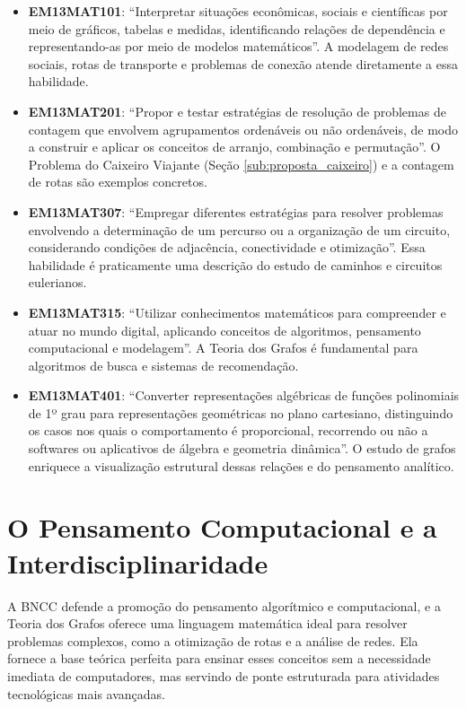 \documentclass[
  12pt,
  oneside,
  a4paper,
  english,
  brazilian
  ]{abntex2}
\theoremstyle{definition}
\begin{document}
\begin{itemize}
  \item \textbf{EM13MAT101}: ``Interpretar situações econômicas, sociais e científicas por meio de gráficos, tabelas e medidas, identificando relações de dependência e representando-as por meio de modelos matemáticos''. A modelagem de redes sociais, rotas de transporte e problemas de conexão atende diretamente a essa habilidade.
  \item \textbf{EM13MAT201}: ``Propor e testar estratégias de resolução de problemas de contagem que envolvem agrupamentos ordenáveis ou não ordenáveis, de modo a construir e aplicar os conceitos de arranjo, combinação e permutação''. O Problema do Caixeiro Viajante (Seção \ref{sub:proposta_caixeiro}) e a contagem de rotas são exemplos concretos. 
  \item \textbf{EM13MAT307}: ``Empregar diferentes estratégias para resolver problemas envolvendo a determinação de um percurso ou a organização de um circuito, considerando condições de adjacência, conectividade e otimização''. Essa habilidade é praticamente uma descrição do estudo de caminhos e circuitos eulerianos.
  \item \textbf{EM13MAT315}: ``Utilizar conhecimentos matemáticos para compreender e atuar no mundo digital, aplicando conceitos de algoritmos, pensamento computacional e modelagem''. A Teoria dos Grafos é fundamental para algoritmos de busca e sistemas de recomendação.
  \item \textbf{EM13MAT401}: ``Converter representações algébricas de funções polinomiais de 1º grau para representações geométricas no plano cartesiano, distinguindo os casos nos quais o comportamento é proporcional, recorrendo ou não a softwares ou aplicativos de álgebra e geometria dinâmica''. O estudo de grafos enriquece a visualização estrutural dessas relações e do pensamento analítico.
\end{itemize}

\section{O Pensamento Computacional e a Interdisciplinaridade}

A BNCC defende a promoção do pensamento algorítmico e computacional, e a Teoria dos Grafos oferece uma linguagem matemática ideal para resolver problemas complexos, como a otimização de rotas e a análise de redes. Ela fornece a base teórica perfeita para ensinar esses conceitos sem a necessidade imediata de computadores, mas servindo de ponte estruturada para atividades tecnológicas mais avançadas.
\end{document}
